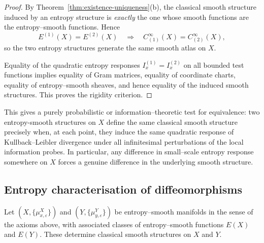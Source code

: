 \documentclass[11pt]{amsart}
\theoremstyle{definition}
\theoremstyle{remark}
\begin{document}
\begin{proof}
By Theorem~\ref{thm:existence-uniqueness}(b), the classical smooth structure induced by an entropy structure is 
\emph{exactly} the one whose smooth functions are the entropy--smooth functions.  
Hence
\[
E^{(1)}(X)=E^{(2)}(X)
\quad\Longrightarrow\quad
C^\infty_{(1)}(X) = C^\infty_{(2)}(X),
\]
so the two entropy structures generate the same smooth atlas on $X$.

Equality of the quadratic entropy responses $I_x^{(1)}=I_x^{(2)}$ on all bounded 
test functions implies equality of Gram matrices, equality of coordinate charts, 
equality of entropy--smooth sheaves, and hence equality of the induced smooth structures.  
This proves the rigidity criterion.
\end{proof}


This gives a purely probabilistic or information--theoretic test for
equivalence: two entropy-smooth structures on $X$ define the same classical smooth structure precisely when, at each point, they induce the same quadratic
response of Kullback--Leibler divergence under all infinitesimal
perturbations of the local information probes.  In particular, any
difference in small--scale entropy response somewhere on $X$ forces a
genuine difference in the underlying smooth structure.

\subsection{Entropy characterisation of diffeomorphisms}

Let $(X,\{\mu^X_{x,\varepsilon}\})$ and $(Y,\{\mu^Y_{y,\varepsilon}\})$ be
entropy--smooth manifolds in the sense of the axioms above, with associated
classes of entropy--smooth functions $ E(X)$ and $ E(Y)$.
These determine classical smooth structures on $X$ and $Y$.
\end{document}
